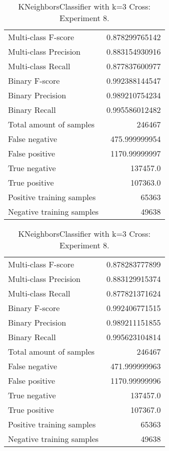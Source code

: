 \begin{table}[H]
\begin{minipage}{0.5\textwidth}
\caption{KNeighborsClassifier with k=3 Cross: Experiment 7.}
\centering
\begin{tabular}{l r}
\toprule
Multi-class F-score & 0.878299765142 \\
Multi-class Precision & 0.883154930916 \\
Multi-class Recall & 0.877837600977 \\
\midrule
Binary F-score & 0.992388144547 \\
Binary Precision & 0.989210754234 \\
Binary Recall & 0.995586012482 \\
\midrule
Total amount of samples & 246467 \\
False negative & 475.999999954 \\
False positive & 1170.99999997 \\
True negative & 137457.0 \\
True positive & 107363.0 \\
\midrule
Positive training samples & 65363 \\
Negative training samples & 49638 \\
\bottomrule
\end{tabular}
\end{minipage}
\hfillx
\begin{minipage}{0.5\textwidth}
\caption{KNeighborsClassifier with k=3 Cross: Experiment 8.}
\centering
\begin{tabular}{l r}
\toprule
Multi-class F-score & 0.878283777899 \\
Multi-class Precision & 0.883129915374 \\
Multi-class Recall & 0.877821371624 \\
\midrule
Binary F-score & 0.992406771515 \\
Binary Precision & 0.989211151855 \\
Binary Recall & 0.995623104814 \\
\midrule
Total amount of samples & 246467 \\
False negative & 471.999999963 \\
False positive & 1170.99999996 \\
True negative & 137457.0 \\
True positive & 107367.0 \\
\midrule
Positive training samples & 65363 \\
Negative training samples & 49638 \\
\bottomrule
\end{tabular}
\end{minipage}
\end{table}
